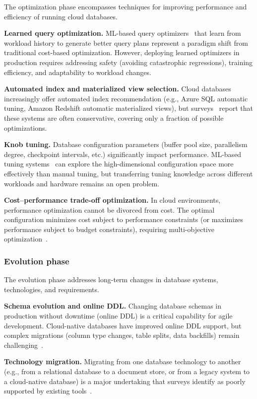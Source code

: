 \documentclass[a4paper,fleqn]{cas-sc}
\begin{document}
The optimization phase encompasses techniques for improving performance and efficiency of running cloud databases.

\textbf{Learned query optimization.} ML-based query optimizers~\cite{Marcus2021Bao,Zhou2022AI4DB} that learn from workload history to generate better query plans represent a paradigm shift from traditional cost-based optimization. However, deploying learned optimizers in production requires addressing safety (avoiding catastrophic regressions), training efficiency, and adaptability to workload changes.

\textbf{Automated index and materialized view selection.} Cloud databases increasingly offer automated index recommendation (e.g., Azure SQL automatic tuning, Amazon Redshift automatic materialized views), but surveys~\cite{Zhou2022AI4DB} report that these systems are often conservative, covering only a fraction of possible optimizations.

\textbf{Knob tuning.} Database configuration parameters (buffer pool size, parallelism degree, checkpoint intervals, etc.) significantly impact performance. ML-based tuning systems~\cite{Zhang2022CDBTune,Tan2019iBTune} can explore the high-dimensional configuration space more effectively than manual tuning, but transferring tuning knowledge across different workloads and hardware remains an open problem.

\textbf{Cost--performance trade-off optimization.} In cloud environments, performance optimization cannot be divorced from cost. The optimal configuration minimizes cost subject to performance constraints (or maximizes performance subject to budget constraints), requiring multi-objective optimization~\cite{Leis2023CloudPricing}.

\subsubsection{Evolution phase}
\label{subsubsec:evolution}

The evolution phase addresses long-term changes in database systems, technologies, and requirements.

\textbf{Schema evolution and online DDL.} Changing database schemas in production without downtime (online DDL) is a critical capability for agile development. Cloud-native databases have improved online DDL support, but complex migrations (column type changes, table splits, data backfills) remain challenging~\cite{Li2024CloudNativeSurvey}.

\textbf{Technology migration.} Migrating from one database technology to another (e.g., from a relational database to a document store, or from a legacy system to a cloud-native database) is a major undertaking that surveys identify as poorly supported by existing tools~\cite{Mathew2021CloudMigration}.
\end{document}

